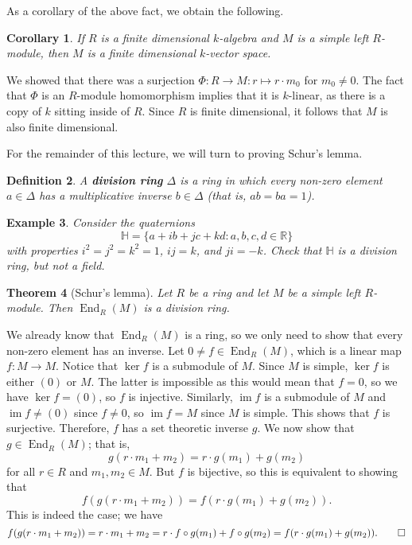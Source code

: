 \documentclass[10pt]{article}
\makeatletter
\numberwithin{equation}{section}
\newcommand{\R}{\mathbb{R}}
\DeclareMathOperator{\End}{End}
\DeclareMathOperator{\im}{im}
\theoremstyle{newstyle}
\newtheorem{thm}{Theorem}[section]
\newtheorem{cor}[thm]{Corollary}
\newtheorem{defn}[thm]{Definition}
\newtheorem{exmp}[thm]{Example}
\newenvironment{pf}[1][\proofname]{\par
  \pushQED{\qed}%
  \normalfont \topsep0\p@\relax
  \trivlist
  \item[\hskip\labelsep\scshape
  #1\@addpunct{.}]\ignorespaces
}{%
  \popQED\endtrivlist\@endpefalse
}
\makeatother
\begin{document}
As a corollary of the above fact, we obtain the following. 

\begin{cor}
If $R$ is a finite dimensional $k$-algebra and $M$ is a simple left $R$-module, then $M$ is a 
finite dimensional $k$-vector space.
\end{cor}

\begin{pf}
We showed that there was a surjection $\Phi : R \to M : r \mapsto r \cdot m_0$
for $m_0 \neq 0$. The fact that $\Phi$ is an $R$-module homomorphism implies that it is $k$-linear, 
as there is a copy of $k$ sitting inside of $R$. Since $R$ is finite dimensional, it follows that 
$M$ is also finite dimensional.
\end{pf}

For the remainder of this lecture, we will turn to proving Schur's lemma. 

\begin{defn}
A {\bf division ring} $\Delta$ is a ring in which every non-zero element $a \in \Delta$ 
has a multiplicative inverse $b \in \Delta$ (that is, $ab = ba = 1$).
\end{defn}

\begin{exmp}
Consider the quaternions 
\[ \mathbb{H} = \{a + ib + jc + kd : a, b, c, d \in \R\} \]
with properties 
$i^2 = j^2 = k^2 = 1$, $ij = k$, and $ji = -k$. Check that $\mathbb{H}$ is a division ring, 
but not a field.
\end{exmp}

\begin{thm}[Schur's lemma]
Let $R$ be a ring and let $M$ be a simple left $R$-module. Then $\End_R(M)$ is a division ring.
\end{thm}
\begin{pf}
We already know that $\End_R(M)$ is a ring, so we only need to show that every non-zero element 
has an inverse. Let $0 \neq f \in \End_R(M)$, which is a linear map $f : M \to M$. Notice that 
$\ker f$ is a submodule of $M$. Since $M$ is simple, $\ker f$ is either $(0)$ or $M$. The latter 
is impossible as this would mean that $f = 0$, so we have $\ker f = (0)$, so $f$ is injective. 
Similarly, $\im f$ is a submodule of $M$ and $\im f \neq (0)$ since $f \neq 0$, so 
$\im f = M$ since $M$ is simple. This shows that $f$ is surjective. Therefore, $f$ has a 
set theoretic inverse $g$. We now show that $g \in \End_R(M)$; that is, 
\[ g(r \cdot m_1 + m_2) = r \cdot g(m_1) + g(m_2) \]
for all $r \in R$ and $m_1, m_2 \in M$. But $f$ is bijective, so this is equivalent to showing that 
\[ f(g(r \cdot m_1 + m_2)) = f(r \cdot g(m_1) + g(m_2)). \]
This is indeed the case; we have 
\[ f(g(r \cdot m_1 + m_2)) = r \cdot m_1 + m_2 = r \cdot f \circ g(m_1) + f \circ g(m_2) = f(r \cdot g(m_1) + g(m_2)). \qedhere \]
\end{pf}
\end{document}

